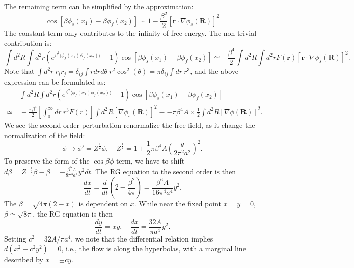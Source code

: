\documentclass{SciPost}
\begin{document}
The remaining term can be simplified by the approximation:
\begin{equation*}
	\cos\left[\beta\phi_s(x_1) -\beta\phi_f(x_2)\right]
	\sim 1-\frac{\beta^2}{2} [\bm r \cdot \nabla\phi_s(\bm R)]^2
\end{equation*}
The constant term only contributes to the infinity of free energy.
The non-trivial contribution is:
\begin{equation*}
	\int d^2 R \int d^2 r \left(e^{\beta^2 \langle\phi_f(x_1)\phi_f(x_2)\rangle}-1 \right)\cos\left[\beta\phi_s(x_1) -\beta\phi_f(x_2)\right] 
	\simeq  -\frac{\beta^4}{2} \int d^2 R \int d^2r F(\bm r) [\bm r \cdot \nabla\phi_s(\bm R)]^2.
\end{equation*}
Note that $\int d^2r\ r_i r_j = \delta_{ij} \int r dr d\theta\ r^2 \cos^2(\theta) = \pi \delta_{ij} \int dr\ r^3$, and the above expression can be formulated as:
\begin{equation*}
\begin{aligned}
	&\ \int d^2 R \int d^2 r \left(e^{\beta^2 \langle\phi_f(x_1)\phi_f(x_2)\rangle}-1 \right)\cos\left[\beta\phi_s(x_1) -\beta\phi_f(x_2)\right] \\
	\simeq &\ -\frac{\pi \beta^4}{2} \left[\int_0^\infty dr\ r^3 F(r)\right] \int d^2 R [\nabla\phi_s(\bm R)]^2 
	\equiv  -\pi \beta^4 A \times \frac{1}{2}\int d^2 R [\nabla\phi(\bm R)]^2.
\end{aligned}
\end{equation*}
We see the second-order perturbation renormalize the free field, as it change the normalization of the field:
\begin{equation*}
	\phi \rightarrow \phi' = Z^{\frac{1}{2}} \phi, \quad 
	Z^{\frac{1}{2}} = 1 +\frac{1}{2} \pi \beta^4 A \left( \frac{y}{2\pi^2 a^2} \right)^2.
\end{equation*}
To preserve the form of the $\cos\beta\phi$ term, we have to shift $d\beta = Z^{-\frac{1}{2}}\beta - \beta = -\frac{\beta^5 A}{8 \pi^3 a^4} y^2 dt$.
The RG equation to the second order is then
\begin{equation*}
	\frac{dx}{dt} = \frac{d}{dt}\left(2-\frac{\beta^2}{4\pi}\right)
	= \frac{\beta^6 A}{16\pi^4 a^4} y^2.
\end{equation*}
The $\beta = \sqrt{4\pi(2-x)}$ is dependent on $x$.
While near the fixed point $x=y=0$, $\beta \simeq \sqrt{8\pi}$, the RG equation is then
\begin{equation}
	\frac{dy}{dt} = xy, \quad
	\frac{dx}{dt} = \frac{32 A}{\pi a^4} y^2.
\end{equation}
Setting $c^2 = 32A/\pi a^4$, we note that the differential relation implies $d(x^2- c^2 y^2) = 0$, i.e., the flow is along the hyperbolas, with a marginal line described by $x = \pm cy$.
\end{document}
